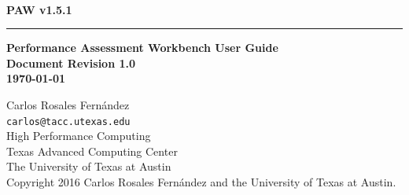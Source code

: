\documentclass[10pt,a4paper]{report}
\begin{document}
\begin{titlepage}
\thispagestyle{empty}	%
\verb+ +
\vspace{1em}
\begin{flushright}
\huge\bf PAW v1.5.1\\
\rule{\textwidth}{4pt}
\large{\bf Performance Assessment Workbench User Guide\\
Document Revision 1.0\\
\today}
\end{flushright}

\newpage
\thispagestyle{empty}
\begin{flushleft}
Carlos Rosales Fern\'andez\\
\verb+carlos@tacc.utexas.edu+\\
\vspace{0.5em}
High Performance Computing \\
Texas Advanced Computing Center\\
The University of Texas at Austin\\
\vspace{1cm}
Copyright 2016 Carlos Rosales Fern\'andez and the University of Texas at Austin.
\end{flushleft}
\newpage
\end{titlepage}
\end{document}
